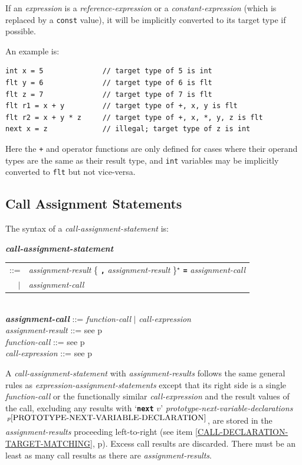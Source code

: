 \documentclass[12pt]{article}
\newcommand{\TT}[1]{{\tt \bfseries #1}}
\newcommand{\STAR}{{\Large $^\star$}}
\newcommand{\emkey}[1]{{\em \bfseries #1}}
\newcommand{\pagref}[1]{p\pageref{#1}}
\newcommand{\pagnote}[1]{$\,^{p\pageref{#1}}$}
\newenvironment{indpar}[1][0.3in]%
	{\begin{list}{}%
		     {\setlength{\itemsep}{0in}%
		      \setlength{\topsep}{0in}%
		      \setlength{\parsep}{1ex}%
		      \setlength{\labelwidth}{#1}%
		      \setlength{\leftmargin}{#1}%
		      \addtolength{\leftmargin}{\labelsep}}%
	 \item}%
	{\end{list}}
\begin{document}
If an {\em expression} is a {\em reference-expression}
or a {\em constant-expression}
(which is replaced by a {\tt const} value),
it will be implicitly
converted to its target type if possible.

An example is:
\begin{indpar}\begin{verbatim}
int x = 5              // target type of 5 is int
flt y = 6              // target type of 6 is flt
flt z = 7              // target type of 7 is flt
flt r1 = x + y         // target type of +, x, y is flt
flt r2 = x + y * z     // target type of +, x, *, y, z is flt
next x = z             // illegal; target type of z is int
\end{verbatim}\end{indpar}

Here the {\tt +} and {\tt *} operator functions are only defined
for cases where their operand types are the same as their result type,
and {\tt int} variables may be implicitly converted to {\tt flt}
but not vice-versa.

\subsection{Call Assignment Statements}
\label{CALL-ASSIGNMENT-STATEMENTS}

The syntax of a {\em call-assignment-statement} is:
\begin{indpar}
\emkey{call-assignment-statement} \\
\hspace*{0.5in} \begin{tabular}{rl}
                ::= & {\em assignment-result}
                      \{ \TT{,} {\em assignment-result} \}\STAR{}
		      \TT{=} {\em assignment-call} \\
		$|$ & {\em assignment-call}
		\end{tabular}
\\[0.5ex]
\emkey{assignment-call} ::= {\em function-call} $|$
                            {\em call-expression}
\\[0.5ex]
{\em assignment-result} ::= see \pagref{ASSIGNMENT-RESULT}
\\[0.5ex]
{\em function-call} ::= see \pagref{FUNCTION-CALL}
\\[0.5ex]
{\em call-expression} ::= see \pagref{CALL-EXPRESSION}
\end{indpar}

A {\em call-assignment-statement} with {\em assignment-results}
follows the same general rules
as {\em expres\-sion-assignment-state\-ments} except that its right
side is a single {\em function-call} or the functionally similar
{\em call-expression} and the result values of the call,
excluding any results with `\TT{next} $v$'
{\em prototype-next-variable-declarations}%
\pagnote{PROTOTYPE-NEXT-VARIABLE-DECLARATION},
are stored
in the {\em assignment-results} proceeding left-to-right
(see item \ref{CALL-DECLARATION-TARGET-MATCHING},
\pagref{CALL-DECLARATION-TARGET-MATCHING}).
Excess call results are discarded.  There must be an least as many
call results as there are {\em assignment-results}.
\end{document}

